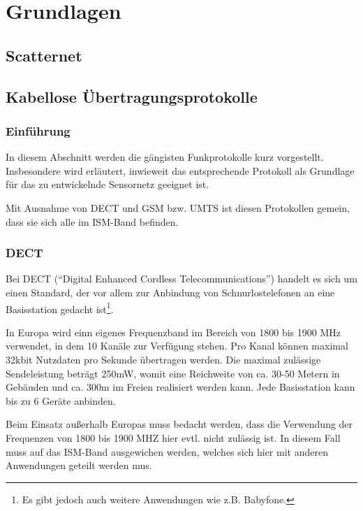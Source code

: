 
\chapter{Grundlagen}\label{Grundlagen}

\section{Scatternet}

\section{Kabellose Übertragungsprotokolle}
    \subsection{Einführung}
    In diesem Abschnitt werden die gängisten Funkprotokolle kurz vorgestellt. Insbesondere wird erläutert,
    inwieweit das entsprechende Protokoll als Grundlage für das zu entwickelnde Sensornetz geeignet ist.

    Mit Ausnahme von DECT und GSM bzw. UMTS ist diesen Protokollen gemein, dass sie sich alle im ISM-Band 
    befinden. 

\subsection{DECT}

Bei DECT ("`Digital Enhanced Cordless Telecommunications"') handelt es sich um einen Standard, 
der vor allem zur Anbindung von Schnurlostelefonen an eine Basisstation gedacht ist\footnote{Es gibt
jedoch auch weitere Anwendungen wie z.B. Babyfone.}. 

In Europa wird einn eigenes Frequenzband im Bereich von 1800 bis 1900 MHz verwendet, in dem 10 
Kanäle zur Verfügung stehen. Pro Kanal können maximal 32kbit Nutzdaten pro Sekunde übertragen
werden. Die maximal zulässige Sendeleistung beträgt 250mW, womit eine Reichweite von ca. 30-50
Metern in Gebäuden und ca. 300m im Freien realisiert werden kann. Jede Basisstation kann
bis zu 6 Geräte anbinden.

Beim Einsatz außerhalb Europas muss bedacht werden, dass die Verwendung der Frequenzen von
1800 bis 1900 MHZ hier evtl. nicht zulässig ist. In diesem Fall muss auf das ISM-Band 
ausgewichen werden, welches sich hier mit anderen Anwendungen geteilt werden mus.

